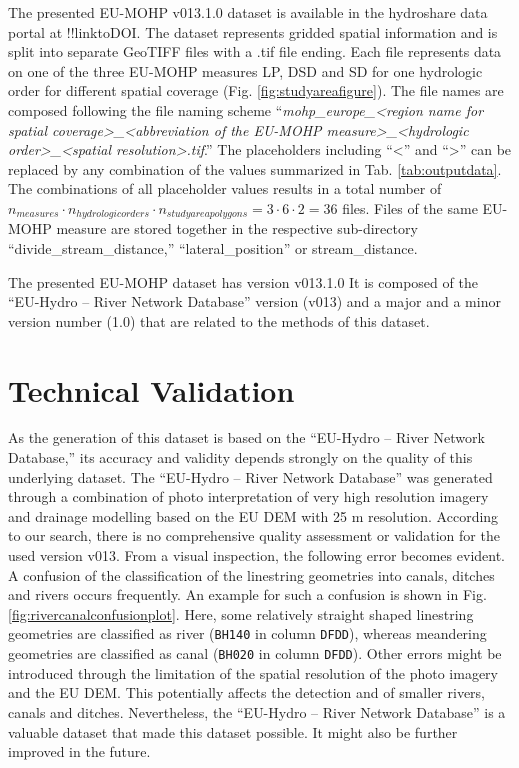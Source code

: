 \documentclass[fleqn,10pt]{wlscirep}
\begin{document}
The presented EU-MOHP v013.1.0 dataset is available in the hydroshare data portal at !!linktoDOI. The dataset represents gridded spatial information and is split into separate GeoTIFF files with a .tif file ending. Each file represents data on one of the three EU-MOHP measures LP, DSD and SD for one hydrologic order for different spatial coverage (Fig. \ref{fig:studyareafigure}). The file names are composed following the file naming scheme ``\emph{mohp\_europe\_\textless region name for spatial coverage\textgreater\_\textless abbreviation of the EU-MOHP measure\textgreater\_\textless hydrologic order\textgreater\_\textless spatial resolution\textgreater.tif}.'' The placeholders including ``\textless{}'' and ``\textgreater{}'' can be replaced by any combination of the values summarized in Tab. \ref{tab:outputdata}. The combinations of all placeholder values results in a total number of \(n_{measures}\cdot n_{hydrologic orders}\cdot n_{study area polygons} = 3\cdot 6\cdot 2 = 36\) files. Files of the same EU-MOHP measure are stored together in the respective sub-directory ``divide\_stream\_distance,'' ``lateral\_position'' or stream\_distance.

The presented EU-MOHP dataset has version v013.1.0 It is composed of the ``EU-Hydro -- River Network Database'' version (v013) and a major and a minor version number (1.0) that are related to the methods of this dataset.

\hypertarget{technical-validation}{%
\section*{Technical Validation}\label{technical-validation}}

As the generation of this dataset is based on the ``EU-Hydro -- River Network Database,'' its accuracy and validity depends strongly on the quality of this underlying dataset. The ``EU-Hydro -- River Network Database'' was generated through a combination of photo interpretation of very high resolution imagery and drainage modelling based on the EU DEM with 25 m resolution. According to our search, there is no comprehensive quality assessment or validation for the used version v013. From a visual inspection, the following error becomes evident. A confusion of the classification of the linestring geometries into canals, ditches and rivers occurs frequently. An example for such a confusion is shown in Fig. \ref{fig:rivercanalconfusionplot}. Here, some relatively straight shaped linestring geometries are classified as river (\texttt{BH140} in column \texttt{DFDD}), whereas meandering geometries are classified as canal (\texttt{BH020} in column \texttt{DFDD}). Other errors might be introduced through the limitation of the spatial resolution of the photo imagery and the EU DEM. This potentially affects the detection and of smaller rivers, canals and ditches. Nevertheless, the ``EU-Hydro -- River Network Database'' is a valuable dataset that made this dataset possible. It might also be further improved in the future.
\end{document}
